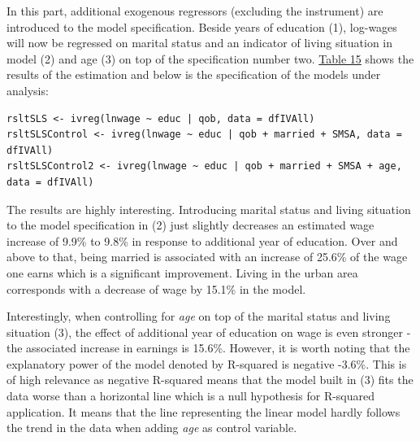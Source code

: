 \documentclass{article}
\begin{document}
In this part, additional exogenous regressors (excluding the instrument) are introduced to the model specification. Beside years of education (1), log-wages will now be regressed on marital status and an indicator of living situation in model (2) and age (3) on top of the specification number two. \hyperref[tab:ivregcontrol]{Table 15} shows the results of the estimation and below is the specification of the models under analysis:

\begin{verbatim}
rsltSLS <- ivreg(lnwage ~ educ | qob, data = dfIVAll)
rsltSLSControl <- ivreg(lnwage ~ educ | qob + married + SMSA, data = dfIVAll)
rsltSLSControl2 <- ivreg(lnwage ~ educ | qob + married + SMSA + age, data = dfIVAll)
\end{verbatim}

The results are highly interesting. Introducing marital status and living situation to the model specification in (2) just slightly decreases an estimated wage increase of 9.9\% to 9.8\% in response to additional year of education. Over and above to that, being married is associated with an increase of 25.6\% of the wage one earns which is a significant improvement. Living in the urban area corresponds with a decrease of wage by 15.1\% in the model.

Interestingly, when controlling for \textit{age} on top of the marital status and living situation (3), the effect of additional year of education on wage is even stronger - the associated increase in earnings is 15.6\%. However, it is worth noting that the explanatory power of the model denoted by R-squared is negative -3.6\%. This is of high relevance as negative R-squared means that the model built in (3) fits the data worse than a horizontal line which is a null hypothesis for R-squared application. It means that the line representing the linear model hardly follows the trend in the data when adding \textit{age} as control variable.
\end{document}
